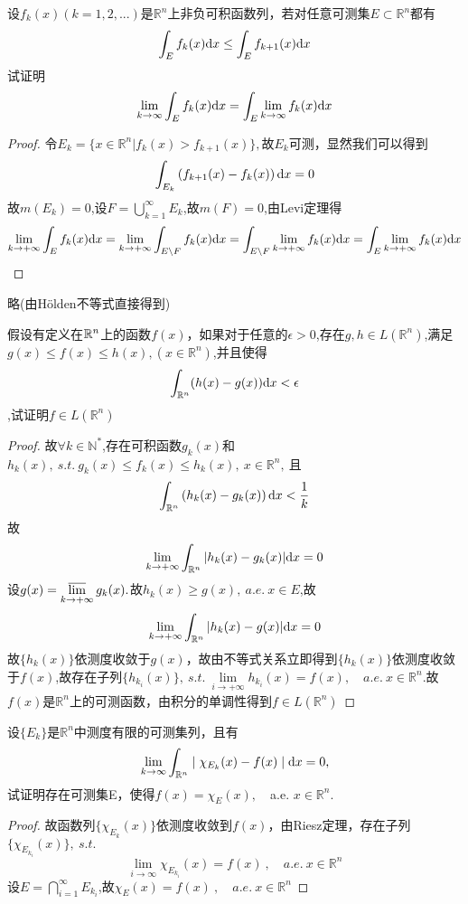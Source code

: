 设$f_k(x)(k=1,2,...)$是$\mathbb{R}^{n}$上非负可积函数列，若对任意可测集$E \subset \mathbb{R}^{n}$都有$$\int_E f_k(x) \mathrm{d}x \leq \int_E f_{k+1}(x) \mathrm{d}x$$试证明$$\lim\limits_{k \to \infty}\int_E f_k(x) \mathrm{d}x = \int_E \lim\limits_{k \to \infty}f_k(x) \mathrm{d}x$$
\begin{proof}
令$E_k=\{x\in \mathbb{R}^n|f_k(x)>f_{k+1}(x)\},$故$E_k$可测，显然我们可以得到$$\int_{E_k}\left(f_{k+1}(x)-f_k(x)\right)\mathrm{d}x=0$$故$m(E_k)=0$,设$F=\bigcup\limits_{k=1}^{\infty}E_k$,故$m(F)=0$,由Levi定理得
$$\lim\limits_{k \to +\infty}\int_{E}f_k(x)\mathrm{d}x=\lim\limits_{k \to +\infty}\int_{E\setminus F}f_k(x)\mathrm{d}x=\int_{E\setminus F}\lim\limits_{k \to +\infty}f_k(x)\mathrm{d}x=\int_{E}\lim\limits_{k \to +\infty}f_k(x)\mathrm{d}x$$
\end{proof}


略(由H{\"o}lden不等式直接得到)


假设有定义在$\mathbb{R}^{n}$上的函数$f(x)$，如果对于任意的$\epsilon>0$,存在$g,h\in L(\mathbb{R}^n)$,满足$g(x) \leq f(x) \leq h(x),(x\in \mathbb{R}^n) $,并且使得$$\int_{\mathbb{R}^n}(h(x)-g(x)) \mathrm{d}x<\epsilon$$,试证明$f\in L(\mathbb{R}^n)$
\begin{proof}
故$\forall k\in \mathbb{N}^*$,存在可积函数$g_k(x)$和$h_k(x),\ s.t.\ g_k(x)\leq f_k(x)\leq h_k(x),\ x\in \mathbb{R}^n,\ $且$$\int_{\mathbb{R}^n}\left(h_k(x)-g_k(x)\right)\mathrm{d}x<\frac{1}{k}$$
故$$\lim\limits_{k \to +\infty}\int_{\mathbb{R}^n}|h_k(x)-g_k(x)|\mathrm{d}x=0$$设$g(x)=\varlimsup\limits_{k \to +\infty}g_k(x).$故$h_k(x)\geq g(x),\ a.e.\ x \in E$,故$$\lim\limits_{k \to +\infty}\int_{\mathbb{R}^n}|h_k(x)-g(x)|\mathrm{d}x=0$$故$\{h_k(x)\}$依测度收敛于$g(x)$，故由不等式关系立即得到$\{h_k(x)\}$依测度收敛于$f(x)$,故存在子列$\{h_{k_i}(x)\},\ s.t.\ \lim\limits_{i \to +\infty}h_{k_i}(x)=f(x),\quad a.e.\  x\in \mathbb{R}^n$.故$f(x)$是$\mathbb{R}^n$上的可测函数，由积分的单调性得到$f\in L(\mathbb{R}^n)$
\end{proof}

设$\{E_k\}$是$\mathbb{R}^n$中测度有限的可测集列，且有$$\lim\limits_{k \to \infty}\int_{\mathbb{R}^n} \mid \chi_{E_k}(x)-f(x) \mid \mathrm{d}x=0,$$试证明存在可测集E，使得$f(x)=\chi_E(x),\quad$a.e. $x \in \mathbb{R}^n$.
\begin{proof}
故函数列$\{\chi_{E_k}(x)\}$依测度收敛到$f(x)$，由Riesz定理，存在子列$\{\chi_{E_{k_i}}(x)\},\ s.t.$ $$\lim\limits_{i\to\infty}\chi_{E_{k_i}}(x)=f(x)\ ,\quad a.e.\ x\in\mathbb{R}^n$$设$E=\bigcap\limits_{i=1}^{\infty}E_{k_i}$,故$\chi_{E}(x)=f(x)\ ,\quad a.e. \ x\in \mathbb{R}^n$
\end{proof}



